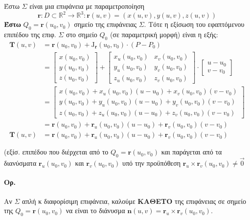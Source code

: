 \documentclass[11pt,a4paper,titlepage,draft]{article}
\begin{document}
Έστω \( \varSigma \) είναι μια  επιφάνεια με παραμετροποίηση
\[
\mathbf r:D \subset \mathbb R ^2 \to \mathbb R ^ 3 : \mathbf r(u,v)=\left(x(u,v),y(u,v),z(u,v)\right)
\]
\textbf{Έστω} \( Q_0  = \mathbf{r}(u_0,v_0) \) σημείο της επιφάνειας \( \varSigma \).
Τότε η εξίσωση του εφαπτόμενου επιπέδου της επιφ. \( \varSigma \) στο σημείο \( Q_0 \) (σε παραμετρική μορφή)
είναι η εξής:
\begin{align*}
\mathbf T(u,v) &= \mathbf{r}(u_0,v_0)+\mathrm J_{\mathbf r}(u_0,v_0)\cdot(P-P_0)
\\ &= \left[\begin{matrix}
x(u_0,v_0) \\ y(u_0,v_0) \\ z(u_0,v_0)
\end{matrix}\right] + \left[ \begin{matrix}
x_u(u_0,v_0) & x_v(u_0,v_0) \\
y_u(u_0,v_0) & y_v(u_0,v_0) \\
z_u(u_0,v_0) & z_v(u_0,v_0)
\end{matrix} \right] \cdot \left[ \begin{matrix}
u-u_0 \\ v-v_0
\end{matrix} \right]
\\ &= \left[\begin{matrix}
x(u_0,v_0)+x_u(u_0,v_0)(u-u_0)+x_v(u_0,v_0)(v-v_0) \\
y(u_0,v_0)+y_u(u_0,v_0)(u-u_0)+y_v(u_0,v_0)(v-v_0) \\
z(u_0,v_0)+z_u(u_0,v_0)(u-u_0)+z_v(u_0,v_0)(v-v_0)
\end{matrix} \right]
\\ &= \mathbf r(u_0,v_0) + \mathbf r_u(u_0,v_0)(u-u_0) + \mathbf r_v(u_0,v_0)(v-v_0) \\
\mathbf T(u,v) &= \mathbf r(u_0,v_0) + \mathbf r_u(u_0,v_0)(u-u_0) + \mathbf r_v(u_0,v_0)(v-v_0)
\end{align*}

(εξίσ. επιπέδου που διέρχεται από το \( Q_0=\mathbf r(u_0,v_0) \) και παράγεται από τα διανύσματα \( \mathbf r_u(u_0,v_0) \) και \( \mathbf r_v(u_0,v_0) \) υπό την προϋπόθεση \( \mathbf r_u \times \mathbf r_v(u_0,v_0) \neq \vec 0 \)

\paragraph{Ορ.}
Αν \( \varSigma \) απλή κ διαφορίσιμη επιφάνεια, καλούμε \textbf{ΚΑΘΕΤΟ} της επιφάνειας σε σημείο της \( Q_0 = \mathbf r(u_0,v_0) \) να είναι το διάνυσμα \( \mathbf n(u,v) = \mathbf r_u \times \mathbf r_v(u_0,v_0) \).
\end{document}
